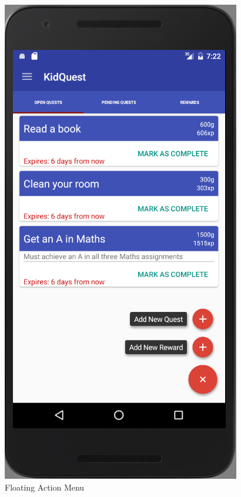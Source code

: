 \begin{figure}[ht] 
  \begin{minipage}[b]{0.45\linewidth}
    \centering
    \includegraphics[width=.7\linewidth, frame]{../images/Screenshot/FabMenu.png} 
    \caption{Floating Action Menu} 
    \vspace{4ex}
  \end{minipage}%
  \begin{minipage}[b]{0.45\linewidth}
    \centering

\end{minipage}
\end{figure}
